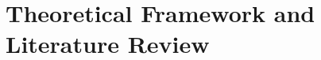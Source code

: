 \documentclass[12pt]{article}
\begin{document}
\section{Theoretical Framework and Literature Review}



\end{document}
